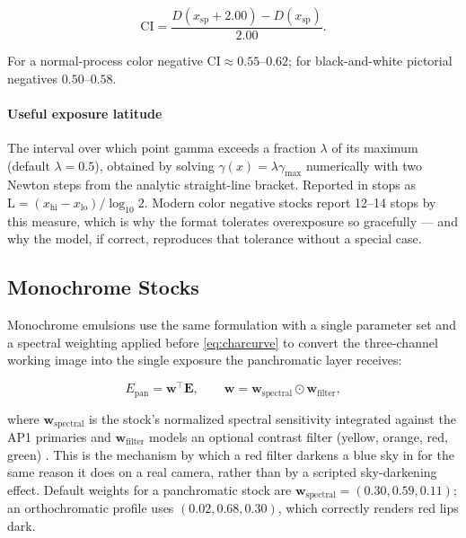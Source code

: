 \begin{equation}
\mathrm{CI} = \frac{D(x_{\mathrm{sp}} + 2.00) - D(x_{\mathrm{sp}})}{2.00}.
\label{eq:ci}
\end{equation}

For a normal-process color negative $\mathrm{CI} \approx 0.55$--$0.62$; for
black-and-white pictorial negatives $0.50$--$0.58$.

\paragraph{Useful exposure latitude} The interval over which point gamma
exceeds a fraction $\lambda$ of its maximum (default $\lambda = 0.5$),
obtained by solving $\gamma(x) = \lambda\gamma_{\max}$ numerically with two
Newton steps from the analytic straight-line bracket. Reported in stops as
$\mathrm{L} = (x_{\mathrm{hi}} - x_{\mathrm{lo}})/\log_{10} 2$. Modern color
negative stocks report 12--14 stops by this measure, which is why the format
tolerates overexposure so gracefully --- and why the model, if correct,
reproduces that tolerance without a special case.

\subsection{Monochrome Stocks}

Monochrome emulsions use the same formulation with a single parameter set and a
spectral weighting applied before \eqref{eq:charcurve} to convert the
three-channel working image into the single exposure the panchromatic layer
receives:

\begin{equation}
E_{\mathrm{pan}} = \mathbf{w}^\top \mathbf{E}, \qquad
\mathbf{w} = \mathbf{w}_{\mathrm{spectral}} \odot \mathbf{w}_{\mathrm{filter}},
\label{eq:pan}
\end{equation}

where $\mathbf{w}_{\mathrm{spectral}}$ is the stock's normalized spectral
sensitivity integrated against the AP1 primaries and
$\mathbf{w}_{\mathrm{filter}}$ models an optional contrast filter (yellow,
orange, red, green) \cite{kodakh1}. This is the mechanism by which a red filter darkens a blue
sky in \EM{} for the same reason it does on a real camera, rather than by a
scripted sky-darkening effect. Default weights for a panchromatic stock are
$\mathbf{w}_{\mathrm{spectral}} = (0.30, 0.59, 0.11)$; an orthochromatic
profile uses $(0.02, 0.68, 0.30)$, which correctly renders red lips dark.

